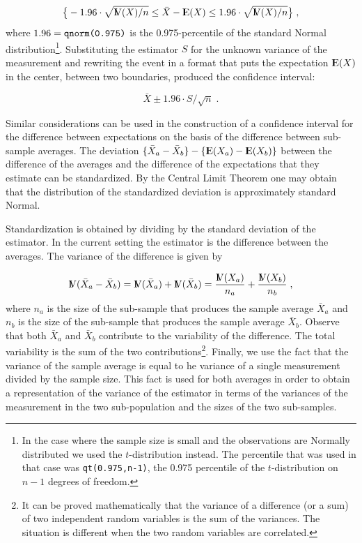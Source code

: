 \documentclass[]{krantz}
\newcommand{\Expec}{{\rm I\kern-.3em E}}
\newcommand{\Var}{{\rm I\kern-.3em V}}
\theoremstyle{definition}
\theoremstyle{definition}
\theoremstyle{definition}
\theoremstyle{remark}
\begin{document}
\[\big\{-1.96 \cdot \sqrt{\Var(X)/n} \leq \bar X - \Expec(X) \leq 1.96 \cdot \sqrt{\Var(X)/n}\big\}\;,\]
where \(1.96 = \mbox{\texttt{qnorm(0.975)}}\) is the 0.975-percentile of
the standard Normal distribution\footnote{In the case where the sample size is small and the observations
  are Normally distributed we used the \(t\)-distribution instead. The
  percentile that was used in that case was \texttt{qt(0.975,n-1)}, the 0.975
  percentile of the \(t\)-distribution on \(n-1\) degrees of freedom.}. Substituting the estimator \(S\) for
the unknown variance of the measurement and rewriting the event in a
format that puts the expectation \(\Expec(X)\) in the center, between two
boundaries, produced the confidence interval:

\[\bar X \pm 1.96 \cdot S/\sqrt{n}\;.\]

Similar considerations can be used in the construction of a confidence
interval for the difference between expectations on the basis of the
difference between sub-sample averages. The deviation
\(\{\bar X_a- \bar X_b\} - \{\Expec(X_a)- \Expec(X_b)\}\) between the
difference of the averages and the difference of the expectations that
they estimate can be standardized. By the Central Limit Theorem one may
obtain that the distribution of the standardized deviation is
approximately standard Normal.

Standardization is obtained by dividing by the standard deviation of the
estimator. In the current setting the estimator is the difference
between the averages. The variance of the difference is given by

\[\Var(\bar X_a- \bar X_b) = \Var(\bar X_a) + \Var(\bar X_b) = \frac{\Var(X_a)}{n_a} + \frac{\Var(X_b)}{n_b}\;,\]
where \(n_a\) is the size of the sub-sample that produces the sample
average \(\bar X_a\) and \(n_b\) is the size of the sub-sample that produces
the sample average \(\bar X_b\). Observe that both \(\bar X_a\) and
\(\bar X_b\) contribute to the variability of the difference. The total
variability is the sum of the two contributions\footnote{It can be proved mathematically that the variance of a difference
  (or a sum) of two independent random variables is the sum of the
  variances. The situation is different when the two random variables
  are correlated.}. Finally, we use the
fact that the variance of the sample average is equal to he variance of
a single measurement divided by the sample size. This fact is used for
both averages in order to obtain a representation of the variance of the
estimator in terms of the variances of the measurement in the two
sub-population and the sizes of the two sub-samples.
\end{document}

